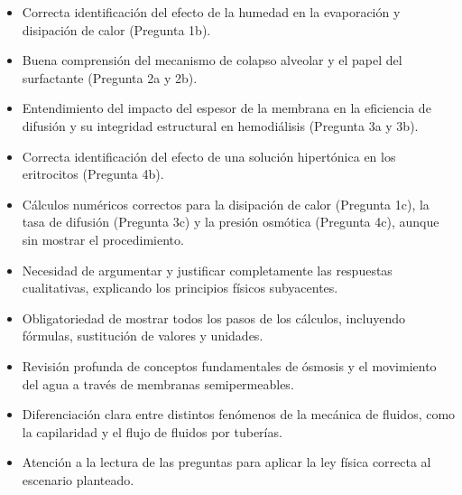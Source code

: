 \documentclass[11pt,a4paper]{article}
\begin{document}
\vspace{4pt}
\begin{minipage}[t]{0.48\linewidth}
  \begin{tcolorbox}[cajaFortaleza, title={Fortalezas}]
\begin{itemize}[leftmargin=1.5em, itemsep=2pt]
  \item Correcta identificación del efecto de la humedad en la evaporación y disipación de calor (Pregunta 1b).
  \item Buena comprensión del mecanismo de colapso alveolar y el papel del surfactante (Pregunta 2a y 2b).
  \item Entendimiento del impacto del espesor de la membrana en la eficiencia de difusión y su integridad estructural en hemodiálisis (Pregunta 3a y 3b).
  \item Correcta identificación del efecto de una solución hipertónica en los eritrocitos (Pregunta 4b).
  \item Cálculos numéricos correctos para la disipación de calor (Pregunta 1c), la tasa de difusión (Pregunta 3c) y la presión osmótica (Pregunta 4c), aunque sin mostrar el procedimiento.
\end{itemize}
  \end{tcolorbox}
\end{minipage}
\hfill
\begin{minipage}[t]{0.48\linewidth}
  \begin{tcolorbox}[cajaMejora, title={Areas de mejora}]
\begin{itemize}[leftmargin=1.5em, itemsep=2pt]
  \item Necesidad de argumentar y justificar completamente las respuestas cualitativas, explicando los principios físicos subyacentes.
  \item Obligatoriedad de mostrar todos los pasos de los cálculos, incluyendo fórmulas, sustitución de valores y unidades.
  \item Revisión profunda de conceptos fundamentales de ósmosis y el movimiento del agua a través de membranas semipermeables.
  \item Diferenciación clara entre distintos fenómenos de la mecánica de fluidos, como la capilaridad y el flujo de fluidos por tuberías.
  \item Atención a la lectura de las preguntas para aplicar la ley física correcta al escenario planteado.
\end{itemize}
  \end{tcolorbox}
\end{minipage}
\end{document}
